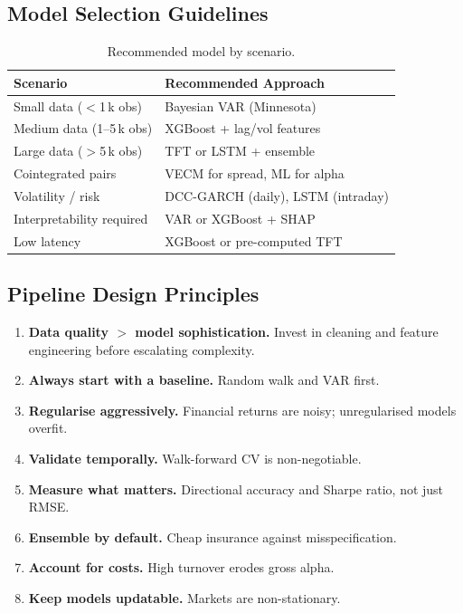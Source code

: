 \documentclass[11pt,a4paper,twocolumn]{article}
\begin{document}
\subsection{Model Selection Guidelines}

\begin{table}[H]
\centering
\caption{Recommended model by scenario.}
\label{tab:guidelines}
\small
\begin{tabular}{@{}p{3.4cm}p{4.2cm}@{}}
\toprule
\textbf{Scenario} & \textbf{Recommended Approach} \\
\midrule
Small data ($<$1\,k obs) & Bayesian VAR (Minnesota) \\
Medium data (1--5\,k obs) & XGBoost + lag/vol features \\
Large data ($>$5\,k obs) & TFT or LSTM + ensemble \\
Cointegrated pairs       & VECM for spread, ML for alpha \\
Volatility / risk        & DCC-GARCH (daily), LSTM (intraday) \\
Interpretability required& VAR or XGBoost + SHAP \\
Low latency              & XGBoost or pre-computed TFT \\
\bottomrule
\end{tabular}
\end{table}

\subsection{Pipeline Design Principles}

\begin{enumerate}[leftmargin=*,itemsep=2pt]
    \item \textbf{Data quality $>$ model sophistication.}  Invest in cleaning
          and feature engineering before escalating complexity.
    \item \textbf{Always start with a baseline.}  Random walk and VAR first.
    \item \textbf{Regularise aggressively.}  Financial returns are noisy;
          unregularised models overfit.
    \item \textbf{Validate temporally.}  Walk-forward CV is non-negotiable.
    \item \textbf{Measure what matters.}  Directional accuracy and Sharpe
          ratio, not just RMSE.
    \item \textbf{Ensemble by default.}  Cheap insurance against
          misspecification.
    \item \textbf{Account for costs.}  High turnover erodes gross alpha.
    \item \textbf{Keep models updatable.}  Markets are non-stationary.
\end{enumerate}
\end{document}
